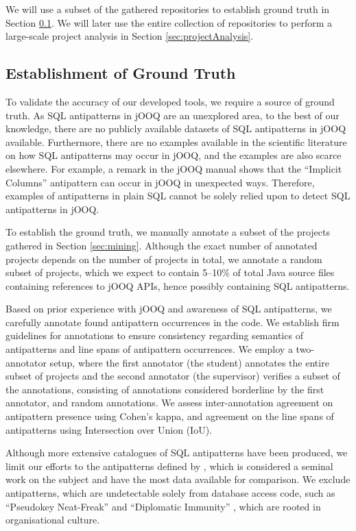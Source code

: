 \documentclass{article}
\begin{document}
We will use a subset of the gathered repositories to establish ground truth in Section \ref{sec:groundTruth}. We will later use the entire collection of repositories to perform a large-scale project analysis in Section \ref{sec:projectAnalysis}.

\subsection{Establishment of Ground Truth}\label{sec:groundTruth}

To validate the accuracy of our developed tools, we require a source of ground truth. As SQL antipatterns in jOOQ are an unexplored area, to the best of our knowledge, there are no publicly available datasets of SQL antipatterns in jOOQ available. Furthermore, there are no examples available in the scientific literature on how SQL antipatterns may occur in jOOQ, and the examples are also scarce elsewhere. For example, a remark in the jOOQ manual \cite{jooq2025select} shows that the “Implicit Columns” antipattern \cite[Ch. 19]{karwin2023sql} can occur in jOOQ in unexpected ways. Therefore, examples of antipatterns in plain SQL cannot be solely relied upon to detect SQL antipatterns in jOOQ.

To establish the ground truth, we manually annotate a subset of the projects gathered in Section \ref{sec:mining}. Although the exact number of annotated projects depends on the number of projects in total, we annotate a random subset of projects, which we expect to contain 5–10\% of total Java source files containing references to jOOQ APIs, hence possibly containing SQL antipatterns.

Based on prior experience with jOOQ and awareness of SQL antipatterns, we carefully annotate found antipattern occurrences in the code. We establish firm guidelines for annotations to ensure consistency regarding semantics of antipatterns and line spans of antipattern occurrences. We employ a two-annotator setup, where the first annotator (the student) annotates the entire subset of projects and the second annotator (the supervisor) verifies a subset of the annotations, consisting of annotations considered borderline by the first annotator, and random annotations. We assess inter-annotation agreement on antipattern presence using Cohen's kappa, and agreement on the line spans of antipatterns using Intersection over Union (IoU).

Although more extensive catalogues of SQL antipatterns have been produced, we limit our efforts to the antipatterns defined by \textcite{karwin2023sql}, which is considered a seminal work on the subject \cite[p. 336]{muse2020prevalence} and have the most data available for comparison. We exclude antipatterns, which are undetectable solely from database access code, such as “Pseudokey Neat-Freak” \cite[Ch. 22]{karwin2023sql} and “Diplomatic Immunity” \cite[Ch. 24]{karwin2023sql}, which are rooted in organisational culture.
\end{document}
